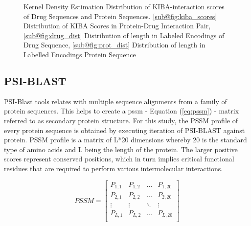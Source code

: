 \begin{figure}[htbp]
           \caption[KDE Distribution]{Kernel Density Estimation Distribution of KIBA-interaction scores of Drug Sequences and Protein Sequences. \ref{sub@fig:kiba_scores} Distribution of KIBA Scores in Protein-Drug Interaction Pair, \ref{sub@fig:drug_dist} Distribution of length in Labeled Encodings of Drug Sequence, \ref{sub@fig:prot_dist} Distribution of length in Labelled Encodings Protein Sequence }
           \label{fig:kiba_drug_protein}
\end{figure}
  

  \subsection{PSI-BLAST}
  PSI-Blast tools relates with multiple sequence alignments from a family of protein sequences\cite{Schaffer2001}. This helps to create a \acrshort{pssm} - Equation (\ref{eq:pssm}) - matrix referred to as secondary protein structure. For this study, the PSSM profile of every protein sequence is obtained by executing iteration of PSI-BLAST against \cite[KEGG]{Schaffer2001} protein. PSSM profile is a matrix of L*20 dimensions whereby 20 is the standard type of amino acids and L being the length of the protein. The larger positive scores represent conserved positions, which in turn implies critical functional residues that are required to perform various intermolecular interactions.\cite[PSSM]{Schaffer2001}
  
  \begin{equation}
    PSSM = \begin{bmatrix}
      P_{1,1} & P_{1,2} & \dots & P_{1,20} \\
      P_{2,1} & P_{2,2} & \dots & P_{2,20} \\
      \vdots  & \vdots  & \ddots & \vdots \\
      P_{L,1} & P_{L,2} & \dots & P_{L,20} \\
    \end{bmatrix}
    \label{eq:pssm}
  \end{equation}
  
